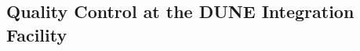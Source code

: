 \begin{comment}
\begin{dunefigure}[Underground handling of the \dwords{apa}]{fig:handling}{(Top row) Handling of an \dword{apa} in the underground storage area where the \dwords{apa} are extracted from the crates, inspected, and readied for installation in the cryostat. (Bottom row) A pair of \dwords{apa} are brought into the space just outside the \dword{tco} to be linked and cabled, then connected to the \dword{dss} and moved into their final position inside the cryostat.}
\setlength{\fboxsep}{0pt}
\setlength{\fboxrule}{0.5pt}
\centering
\fbox{\texttt{[image: sp-apa-install-1.png]}} 
\fbox{\texttt{[image: sp-apa-install-2.png]}} 
\fbox{\texttt{[image: sp-apa-install-3.png]}} 
\\ \vspace*{1.5mm}
\hspace*{-.25mm}
\fbox{\texttt{[image: sp-apa-install-4.png]}}
\hspace*{1.mm}
\fbox{\texttt{[image: sp-apa-install-5.png]}}
\end{dunefigure}
\end{comment}

\subsection{Quality Control at the DUNE Integration Facility}
\label{sec:fdsp-apa-transport-qc}


